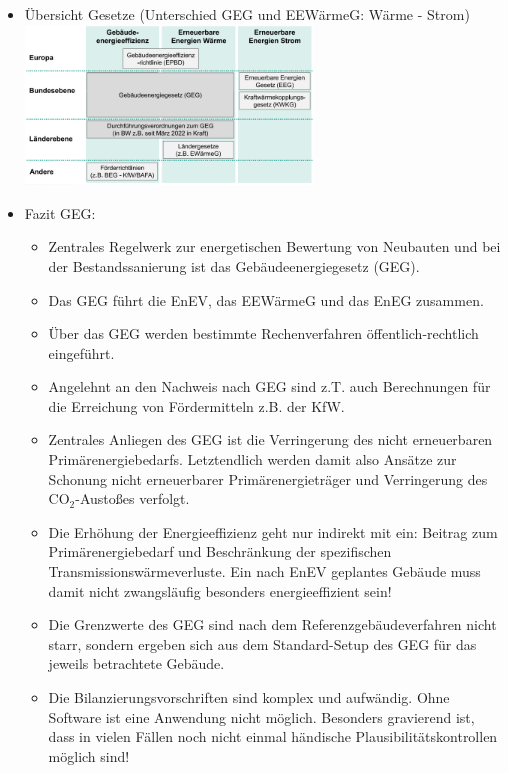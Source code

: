 \documentclass[fleqn,twoside,dvipsnames]{article}
\begin{document}
\begin{itemize}
            \item Übersicht Gesetze (Unterschied GEG und EEWärmeG: Wärme - Strom)\\
                \includegraphics[width=0.6\textwidth]{Grafiken/ES/GEG-EEG.png}
            \item Fazit GEG:
                \begin{itemize}
                    \item Zentrales Regelwerk zur energetischen Bewertung von Neubauten und bei der Bestandssanierung ist das Gebäudeenergiegesetz (GEG).
                    \item Das GEG führt die EnEV, das EEWärmeG und das EnEG zusammen.
                    \item Über das GEG werden bestimmte Rechenverfahren öffentlich-rechtlich eingeführt.
                    \item Angelehnt an den Nachweis nach GEG sind z.T. auch Berechnungen für die Erreichung von Fördermitteln z.B. der KfW.
                    \item Zentrales Anliegen des GEG ist die Verringerung des nicht erneuerbaren Primärenergiebedarfs. Letztendlich werden damit also Ansätze zur Schonung nicht erneuerbarer Primärenergieträger und Verringerung des $\mathrm{CO}_2$-Austoßes verfolgt.
                    \item Die Erhöhung der Energieeffizienz geht nur indirekt mit ein: Beitrag zum Primärenergiebedarf und Beschränkung der spezifischen Transmissionswärmeverluste. Ein nach EnEV geplantes Gebäude muss damit nicht zwangsläufig besonders energieeffizient sein!
                    \item Die Grenzwerte des GEG sind nach dem Referenzgebäudeverfahren nicht starr, sondern ergeben sich aus dem Standard-Setup des GEG für das jeweils betrachtete Gebäude.
                    \item Die Bilanzierungsvorschriften sind komplex und aufwändig. Ohne Software ist eine Anwendung nicht möglich. Besonders gravierend ist, dass in vielen Fällen noch nicht einmal händische Plausibilitätskontrollen möglich sind!

\end{itemize}
\end{itemize}
\end{document}
